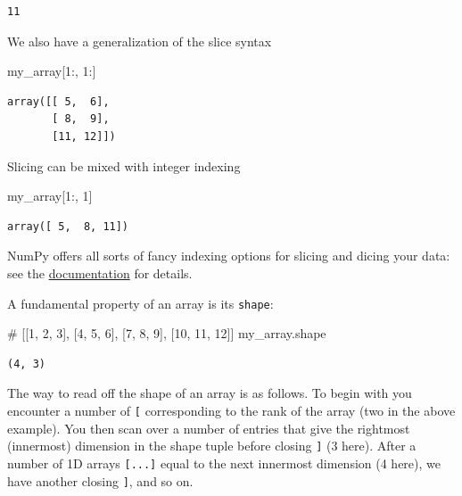 \documentclass[
  letterpaper,
  DIV=11,
  numbers=noendperiod]{scrreprt}
\newenvironment{Shaded}{\begin{snugshade}}{\end{snugshade}}
\newcommand{\CommentTok}[1]{\textcolor[rgb]{0.37,0.37,0.37}{#1}}
\newcommand{\DecValTok}[1]{\textcolor[rgb]{0.68,0.00,0.00}{#1}}
\newcommand{\NormalTok}[1]{\textcolor[rgb]{0.00,0.23,0.31}{#1}}
\theoremstyle{definition}
\theoremstyle{remark}
\begin{document}
\begin{verbatim}
11
\end{verbatim}

We also have a generalization of the slice syntax

\begin{Shaded}
\begin{Highlighting}[]
\NormalTok{my\_array[}\DecValTok{1}\NormalTok{:, }\DecValTok{1}\NormalTok{:]}
\end{Highlighting}
\end{Shaded}

\begin{verbatim}
array([[ 5,  6],
       [ 8,  9],
       [11, 12]])
\end{verbatim}

Slicing can be mixed with integer indexing

\begin{Shaded}
\begin{Highlighting}[]
\NormalTok{my\_array[}\DecValTok{1}\NormalTok{:, }\DecValTok{1}\NormalTok{]}
\end{Highlighting}
\end{Shaded}

\begin{verbatim}
array([ 5,  8, 11])
\end{verbatim}

NumPy offers all sorts of fancy indexing options for slicing and dicing
your data: see the
\href{https://numpy.org/doc/stable/user/basics.indexing.html}{documentation}
for details.

A fundamental property of an array is its \texttt{shape}:

\begin{Shaded}
\begin{Highlighting}[]
\CommentTok{\# [[1, 2, 3], [4, 5, 6], [7, 8, 9], [10, 11, 12]]}
\NormalTok{my\_array.shape}
\end{Highlighting}
\end{Shaded}

\begin{verbatim}
(4, 3)
\end{verbatim}

The way to read off the shape of an array is as follows. To begin with
you encounter a number of \texttt{{[}} corresponding to the rank of the
array (two in the above example). You then scan over a number of entries
that give the rightmost (innermost) dimension in the shape tuple before
closing \texttt{{]}} (3 here). After a number of 1D arrays
\texttt{{[}...{]}} equal to the next innermost dimension (4 here), we
have another closing \texttt{{]}}, and so on.
\end{document}
